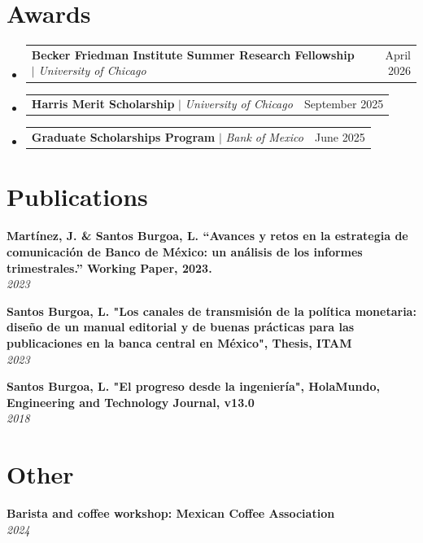 \documentclass[letterpaper,11pt]{article}
\makeatletter
\newcommand{\resumeProjectHeading}[2]{
    \item
    \begin{tabular*}{0.97\textwidth}{l@{\extracolsep{\fill}}r}
      \small#1 & #2 \\
    \end{tabular*}\vspace{-7pt}
}
\newcommand{\resumeSubHeadingListStart}{\begin{itemize}[leftmargin=0.15in, label={}]}
\newcommand{\resumeSubHeadingListEnd}{\end{itemize}}
\makeatother
\begin{document}
 \section{Awards}
    \resumeSubHeadingListStart
     \resumeProjectHeading
        {\textbf{Becker Friedman Institute Summer Research Fellowship} $|$ \emph{University of Chicago}}{April 2026}
    \resumeProjectHeading
        {\textbf{Harris Merit Scholarship} $|$ \emph{University of Chicago}}{September 2025}
     \resumeProjectHeading
        {\textbf{Graduate Scholarships Program} $|$ \emph{Bank of Mexico}}{June 2025}     
   \resumeSubHeadingListEnd

\section{Publications}
  \begin{itemize}[leftmargin=0.15in, label={}]
    \small{\item{
     \textbf{Martínez, J. \& Santos Burgoa, L. “Avances y retos en la estrategia de comunicación de Banco de México: un análisis de los informes trimestrales.” Working Paper, 2023.} \\
     \textit{2023} \\
    }}

        \small{\item{
     \textbf{Santos Burgoa, L. "Los canales de transmisión de la política monetaria: diseño de un manual editorial y de buenas prácticas para las publicaciones en la banca central en México", Thesis, ITAM} \\
     \textit{2023} \\
    }}

        \small{\item{
     \textbf{Santos Burgoa, L. "El progreso desde la ingeniería", HolaMundo, Engineering and Technology Journal, v13.0} \\
     \textit{2018} \\
    }}

 \end{itemize}


\section{Other}
  \begin{itemize}[leftmargin=0.15in, label={}]
    \small{\item{
     \textbf{Barista and coffee workshop: Mexican Coffee Association} \\
     \textit{2024} \\
    }}
 \end{itemize}
\end{document}
